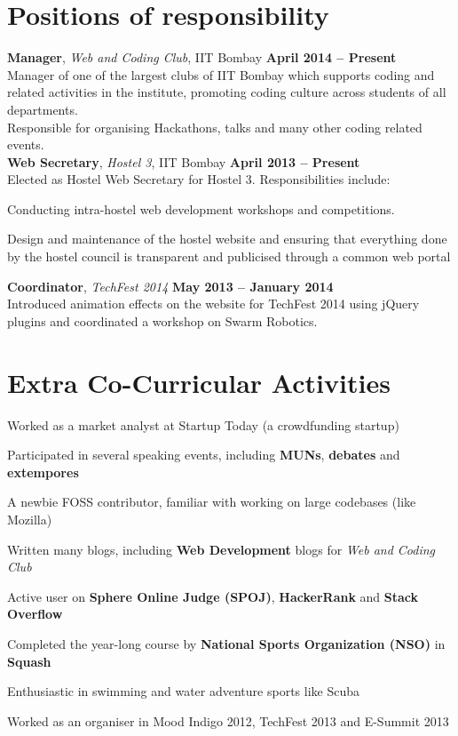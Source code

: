 \documentclass[margin,11pt]{resume}
\begin{document}
\begin{resume}
\section{\mysidestyle Positions of responsibility}
\textbf{Manager}, \textsl{Web and Coding Club}, IIT Bombay \hfill \textbf{April 2014 -- Present}\\
Manager of one of the largest clubs of IIT Bombay which supports coding and related activities in the institute, promoting coding culture across students of all departments. \\ Responsible for organising Hackathons, talks and many other coding related events.
\vspace{2mm}\\
\textbf{Web Secretary}, \textsl{Hostel 3}, IIT Bombay \hfill \textbf{April 2013 -- Present}\\
Elected as Hostel Web Secretary for Hostel 3. Responsibilities include:
\begin{list2}
\item Conducting intra-hostel web development workshops and competitions.
\item Design and maintenance of the hostel website and ensuring that everything done by the hostel council is transparent and publicised through a common web portal
\end{list2}
\vspace{-3mm}
\textbf{Coordinator}, \textsl{TechFest 2014} \hfill \textbf{May 2013 -- January 2014}\\
Introduced animation effects on the website for TechFest 2014 using jQuery plugins and
coordinated a workshop on Swarm Robotics.


\section{\mysidestyle Extra Co-Curricular Activities}
\begin{list2}
\item Worked as a market analyst at Startup Today (a crowdfunding startup)
\item Participated in several speaking events, including \textbf{MUNs}, \textbf{debates} and \textbf{extempores}
\item A newbie FOSS contributor, familiar with working on large codebases (like Mozilla)
\item Written many blogs, including \textbf{Web Development} blogs for \textsl{Web and Coding Club}
\item Active user on \textbf{Sphere Online Judge (SPOJ)}, \textbf{HackerRank} and \textbf{Stack Overflow}
\item Completed the year-long course by \textbf{National Sports Organization (NSO)} in \textbf{Squash}
\item Enthusiastic in swimming and water adventure sports like Scuba
\item Worked as an organiser in Mood Indigo 2012, TechFest 2013 and E-Summit 2013
\end{list2}




\end{resume}
\end{document}
